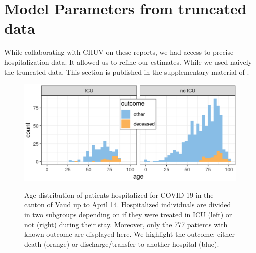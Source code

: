 \section{Model Parameters from truncated data}
While collaborating with CHUV on these reports, we had access to precise hospitalization data. It allowed us to refine our estimates\cite{Rees:COVID19LengthHospital:2020}. While we used naively the truncated data. This section is published in the supplementary material of
.
\begin{figure}[!htb]%
    \centering
        \caption[Age distribution of patients hospitalized for COVID-19 in the canton of Vaud]{Age distribution of patients hospitalized for COVID-19 in the canton of Vaud up to April 14. Hospitalized individuals are divided in two subgroups depending on if they were treated in ICU (left) or not (right) during their stay. Moreover, only the 777 patients with known outcome are displayed here. We highlight the outcome:  either death (orange) or discharge/transfer to another hospital (blue).}
    \includegraphics{fig_covid-switzerland-npi/fig_supp/VD_hist_age_mod.png}
    \label{fig:vdage}
\end{figure}
